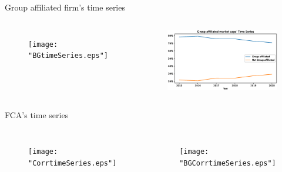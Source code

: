 \documentclass{beamer}
\begin{document}
	\begin{frame}{Group affiliated firm's time series}
		\begin{columns}
	\begin{figure}
	\centering  
	\texttt{[image: "BGtimeSeries.eps"]}
	
\end{figure}  
	\begin{figure}
	\centering  
	\includegraphics[width=\linewidth]{"BGMarketCaptimeSeries.eps"}
	
\end{figure} 
	
\end{columns}
\end{frame}



	\begin{frame}{FCA's time series}
	\begin{columns}
		\begin{figure}
			\centering  
			\texttt{[image: "CorrtimeSeries.eps"]}
		\end{figure}    
		\begin{figure}
			\centering  
			\texttt{[image: "BGCorrtimeSeries.eps"]}
		\end{figure}
		
	\end{columns}
	
\end{frame}
\end{document}
